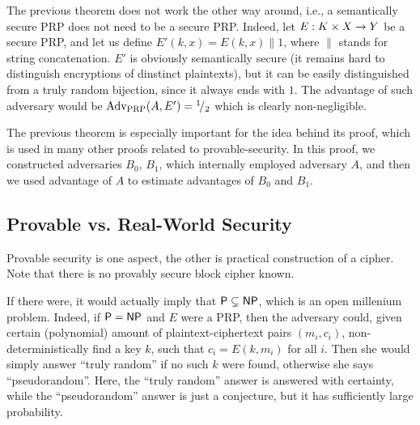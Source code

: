 \begin{note}
	The previous theorem does not work the other way around, i.e., a semantically secure PRP does not need to be a secure PRP. Indeed, let $E: K\times X\rightarrow Y$ be a secure PRP, and let us define $E'(k,x) = E(k,x)\|1$, where $\|$ stands for string concatenation. $E'$ is obviously semantically secure (it remains hard to distinguish encryptions of dinstinct plaintexts), but it can be easily distinguished from a truly random bijection, since it always ends with $1$. The advantage of such adversary would be $\operatorname*{Adv_{PRP}}(A,E') = {}^{1}\!/_{2}$ which is clearly non-negligible.
\end{note}

The previous theorem is especially important for the idea behind its proof, which is used in many other proofs related to provable-security. In this proof, we constructed adversaries $B_0$, $B_1$, which internally employed adversary $A$, and then we used advantage of $A$ to estimate advantages of $B_0$ and $B_1$.



\subsection{Provable vs. Real-World Security}
\label{sec:provable}

Provable security is one aspect, the other is practical construction of a cipher. Note that there is no provably secure block cipher known.

If there were, it would actually imply that $\mathsf{P} \subsetneq \mathsf{NP}$, which is an open millenium problem. Indeed, if $\mathsf{P} = \mathsf{NP}$ and $E$ were a PRP, then the adversary could, given certain (polynomial) amount of plaintext-ciphertext pairs $(m_i,c_i)$, non-deterministically find a key $k$, such that $c_i = E(k,m_i)$ for all $i$. Then she would simply answer ``truly random'' if no such $k$ were found, otherwise she says ``pseudorandom''. Here, the ``truly random'' answer is answered with certainty, while the ``pseudorandom'' answer is just a conjecture, but it has sufficiently large probability.

